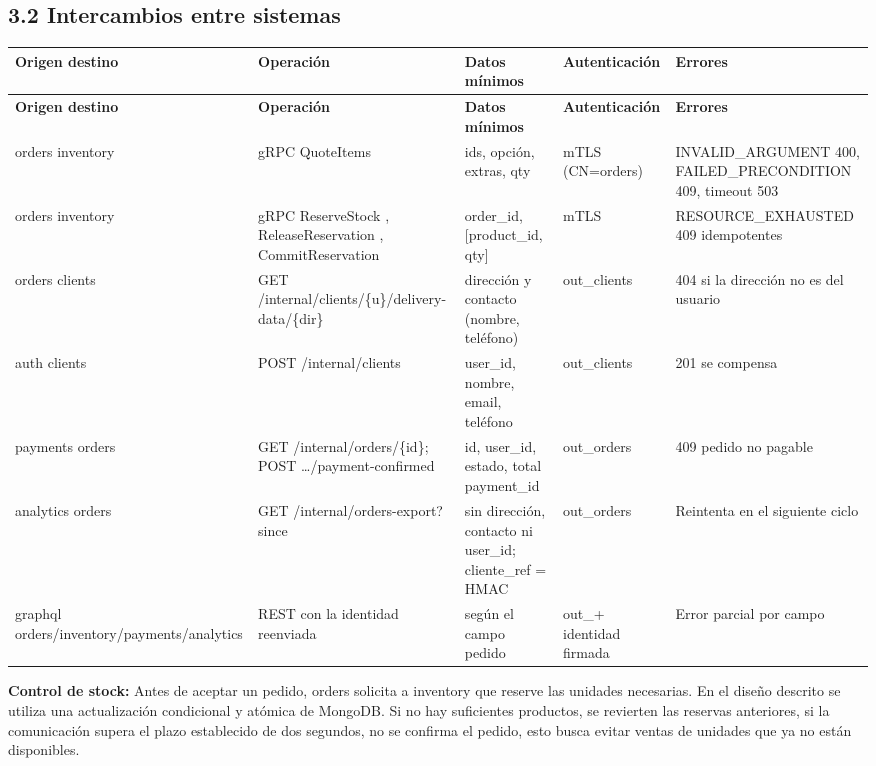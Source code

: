 \documentclass[10pt,letterpaper]{article}
\begin{document}
\subsection*{3.2 Intercambios entre sistemas}
{\footnotesize
\begin{longtable}{|P{\tabcolsep\relax}|P{\tabcolsep\relax}|P{\tabcolsep\relax}|P{\tabcolsep\relax}|P{\tabcolsep\relax}|}
\hline
\textbf{Origen  destino} & \textbf{Operación} & \textbf{Datos mínimos} & \textbf{Autenticación} & \textbf{Errores} \\ \hline
\endfirsthead
\hline
\textbf{Origen  destino} & \textbf{Operación} & \textbf{Datos mínimos} & \textbf{Autenticación} & \textbf{Errores} \\ \hline
\endhead
orders  inventory & gRPC QuoteItems & ids, opción, extras, qty & mTLS (CN=orders) & INVALID\_\allowbreak{}ARGUMENT 400, FAILED\_\allowbreak{}PRECONDITION 409, timeout 503 \\ \hline
orders inventory & gRPC ReserveStock , ReleaseReservation , CommitReservation & order\_\allowbreak{}id, [product\_\allowbreak{}id, qty] & mTLS & RESOURCE\_\allowbreak{}EXHAUSTED 409 idempotentes \\ \hline
orders clients & GET /\allowbreak{}internal/\allowbreak{}clients/\allowbreak{}\{u\}/\allowbreak{}delivery-data/\allowbreak{}\{dir\} & dirección y contacto (nombre, teléfono) & out\_\allowbreak{}clients & 404 si la dirección no es del usuario \\ \hline
auth  clients & POST /\allowbreak{}internal/\allowbreak{}clients & user\_\allowbreak{}id, nombre, email, teléfono & out\_\allowbreak{}clients & 201 se compensa \\ \hline
payments orders & GET /\allowbreak{}internal/\allowbreak{}orders/\allowbreak{}\{id\}; POST …/\allowbreak{}payment-confirmed & id, user\_\allowbreak{}id, estado, total payment\_\allowbreak{}id & out\_\allowbreak{}orders & 409 pedido no pagable \\ \hline
analytics  orders & GET /\allowbreak{}internal/\allowbreak{}orders-export?\allowbreak{}since & sin dirección, contacto ni user\_\allowbreak{}id; cliente\_\allowbreak{}ref = HMAC & out\_\allowbreak{}orders & Reintenta en el siguiente ciclo \\ \hline
graphql orders/\allowbreak{}inventory/\allowbreak{}payments/\allowbreak{}analytics & REST con la identidad reenviada & según el campo pedido & out\_\allowbreak{}+ identidad firmada & Error parcial por campo \\ \hline
\end{longtable}}
\textbf{Control de stock:} Antes de aceptar un pedido, orders solicita a inventory que reserve las unidades necesarias. En el diseño descrito se utiliza una actualización condicional y atómica de MongoDB. Si no hay suficientes productos, se revierten las reservas anteriores, si la comunicación supera el plazo establecido de dos segundos, no se confirma el pedido, esto busca evitar ventas de unidades que ya no están disponibles.
\end{document}
